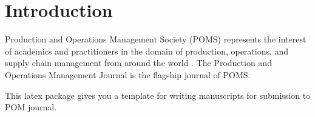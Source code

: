 \documentclass[poms,final,nonblindrev]{poms1_V1} %
\begin{document}
%


\section{Introduction}

Production and Operations Management Society (POMS) represents the interest of academics and practitioners in the domain of production, operations, and supply chain management from around the world \citep{POMS2021}.
The Production and Operations Management Journal is the flagship journal of POMS.

This latex package gives you a template for writing manuscripts for submission to POM journal.
\end{document}
